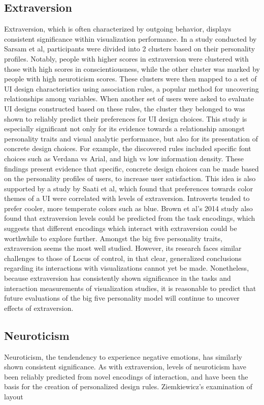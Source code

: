\documentclass[conference]{IEEEtran}
\begin{document}
\subsection{Extraversion}\label{Extraversion}
Extraversion, which is often characterized by outgoing behavior, displays consistent
significance within visualization performance. In a study conducted by Sarsam et al, 
participants were divided into 2 clusters based on their personality profiles. Notably,
people with higher scores in extraversion were clustered with those with high scores in
conscientiousness, while the other cluster was marked by people with high neuroticism scores.
These clusters were then mapped to a set of UI design characteristics using association rules,
a popular method for uncovering relationships among variables. When another set of users were
asked to evaluate UI designs constructed based on these rules, the cluster they belonged to
was shown to reliably predict their preferences for UI design choices\cite{SarsamFirstLook}.
This study is especially significant not only for its evidence towards a relationship amongst
personality traits and visual analytic performance, but also for its presentation of concrete
design choices. For example, the discovered rules included specific font choices such as Verdana
vs Arial, and high vs low information density. These findings present evidence that
specific, concrete design choices can be made based on the personality profiles of users,
to increase user satisfaction. This idea is also supported by a study by Saati et al, which
found that preferences towards color themes of a UI were correlated with levels of
extraversion. Introverts tended to prefer cooler, more temperate colors such as blue\cite{Saati}.
Brown et al's 2014 study also found that extraversion levels could be predicted from the task
encodings, which suggests that different encodings which interact with extraversion could
be worthwhile to explore further\cite{Waldo}. Amongst the big five personality traits,
extraversion seems the most well studied. However, its research faces similar challenges to
those of Locus of control, in that clear, generalized conclusions regarding its interactions
with visualizations cannot yet be made. Nonetheless, because extraversion has consistently
shown significance in the tasks and interaction measurements of visualization studies, it
is reasonable to predict that future evaluations of the big five personality model will
continue to uncover effects of extraversion.

\subsection{Neuroticism}\label{Neuroticism}
Neuroticism, the tendendency to experience negative emotions, has similarly shown consistent
significance. As with extraversion, levels of neuroticism have been reliably predicted from
novel encodings of interaction\cite{Waldo}, and have been the basis for the creation of
personalized design rules\cite{SarsamFirstLook}. Ziemkiewicz's examination of layout 
\end{document}
